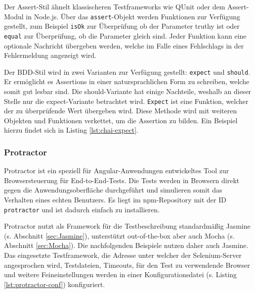 Der Assert-Stil ähnelt klassischeren Testframeworks wie QUnit oder dem Assert-Modul in Node.js. Über das \texttt{assert}-Objekt werden Funktionen zur Verfügung gestellt, zum Beispiel \texttt{isOk} zur Überprüfung ob der Parameter truthy ist oder \texttt{equal} zur Überprüfung, ob die Parameter gleich sind. Jeder Funktion kann eine optionale Nachricht übergeben werden, welche im Falle eines Fehlschlags in der Fehlermeldung angezeigt wird. \cite{chai-assert}

Der BDD-Stil wird in zwei Varianten zur Verfügung gestellt: \texttt{expect} und \texttt{should}. Er ermöglicht es Assertions in einer natursprachlichen Form zu schreiben, welche somit gut lesbar sind. Die should-Variante hat einige Nachteile, weshalb an dieser Stelle nur die expect-Variante betrachtet wird. \texttt{Expect} ist eine Funktion, welcher der zu überprüfende Wert übergeben wird. Diese Methode wird mit weiteren Objekten und Funktionen verkettet, um die Assertion zu bilden. \cite{chai-styles} Ein Beispiel hierzu findet sich in Listing \ref{lst:chai-expect}.

\begin{figure}[H]
	
\end{figure}

\subsubsection{Protractor}
\label{sec:Protractor}
Protractor ist ein speziell für Angular-Anwendungen entwickeltes Tool zur Browsersteuerung für End-to-End-Tests. Die Tests werden in Browsern direkt gegen die Anwendungsoberfläche durchgeführt und simulieren somit das Verhalten eines echten Benutzers. Es liegt im npm-Repository mit der ID \texttt{protractor} und ist dadurch einfach zu installieren. \cite{protractor-index}

Protractor nutzt als Framework für die Testbeschreibung standardmäßig Jasmine (s. Abschnitt \ref{sec:Jasmine}), unterstützt out-of-the-box aber auch Mocha (s. Abschnitt \ref{sec:Mocha}). Die nachfolgenden Beispiele nutzen daher auch Jasmine. Das eingesetzte Testframework, die Adresse unter welcher der Selenium-Server angesprochen wird, Testdateien, Timeouts, für den Test zu verwendende Browser und weitere Feineinstellungen werden in einer Konfigurationsdatei (s. Listing \ref{lst:protractor-conf}) konfiguriert.


